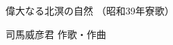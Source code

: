 \documentclass[10pt,b5j]{tarticle} %
\begin{document}
\begin{minipage}[c]{0.7\hsize} %
    \begin{center}
        {\LARGE
            偉大なる北溟の自然 %
        }
        {\small 
            （昭和39年寮歌） %
        }
    \end{center}
\end{minipage}
\begin{minipage}[c]{0.3\hsize} %
    \begin{flushright} %
        司馬威彦君 作歌・作曲 %
    \end{flushright}
\end{minipage}
\end{document}
